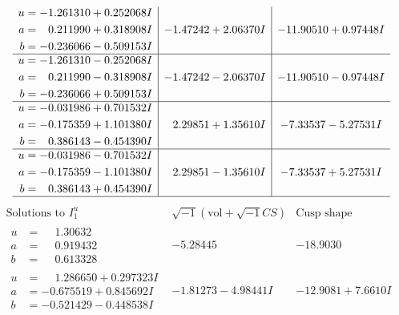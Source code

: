 \documentclass[1p]{elsarticle_modified}
\theoremstyle{definition}
\newcommand{\I}{\sqrt{-1}}
\begin{document}
$$\begin{array}{c|c|c}
\begin{aligned}
u &= -1.261310 + 0.252068 I \\
a &= \phantom{-}0.211990 + 0.318908 I \\
b &= -0.236066 - 0.509153 I\end{aligned}
 & -1.47242 + 2.06370 I & -11.90510 + 0.97448 I \\ \hline\begin{aligned}
u &= -1.261310 - 0.252068 I \\
a &= \phantom{-}0.211990 - 0.318908 I \\
b &= -0.236066 + 0.509153 I\end{aligned}
 & -1.47242 - 2.06370 I & -11.90510 - 0.97448 I \\ \hline\begin{aligned}
u &= -0.031986 + 0.701532 I \\
a &= -0.175359 + 1.101380 I \\
b &= \phantom{-}0.386143 - 0.454390 I\end{aligned}
 & \phantom{-}2.29851 + 1.35610 I & -7.33537 - 5.27531 I \\ \hline\begin{aligned}
u &= -0.031986 - 0.701532 I \\
a &= -0.175359 - 1.101380 I \\
b &= \phantom{-}0.386143 + 0.454390 I\end{aligned}
 & \phantom{-}2.29851 - 1.35610 I & -7.33537 + 5.27531 I\\
 \hline 
 \end{array}$$\newpage$$\begin{array}{c|c|c}  
\text{Solutions to }I^u_{1}& \I (\text{vol} + \sqrt{-1}CS) & \text{Cusp shape}\\
 \hline 
\begin{aligned}
u &= \phantom{-}1.30632\phantom{ +0.000000I} \\
a &= \phantom{-}0.919432\phantom{ +0.000000I} \\
b &= \phantom{-}0.613328\phantom{ +0.000000I}\end{aligned}
 & -5.28445\phantom{ +0.000000I} & -18.9030\phantom{ +0.000000I} \\ \hline\begin{aligned}
u &= \phantom{-}1.286650 + 0.297323 I \\
a &= -0.675519 + 0.845692 I \\
b &= -0.521429 - 0.448538 I\end{aligned}
 & -1.81273 - 4.98441 I & -12.9081 + 7.6610 I \\ \hline\begin{aligned}

\end{aligned}
\end{array}$$
\end{document}
